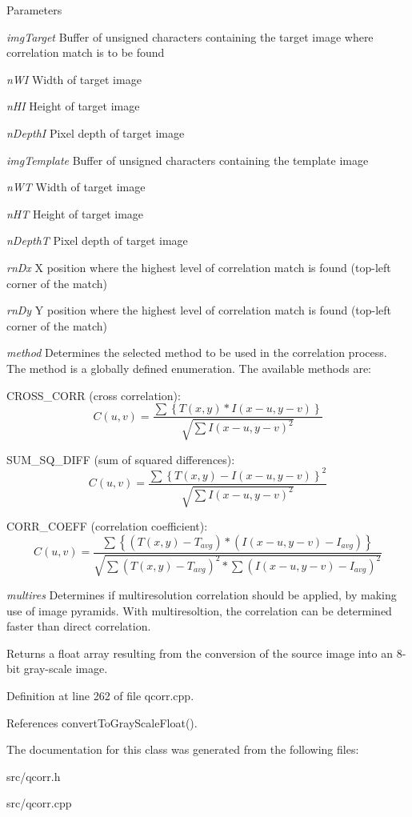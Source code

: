 \begin{DoxyParams}{Parameters}
\item[{\em imgTarget}]Buffer of unsigned characters containing the target image where correlation match is to be found \item[{\em nWI}]Width of target image \item[{\em nHI}]Height of target image \item[{\em nDepthI}]Pixel depth of target image \item[{\em imgTemplate}]Buffer of unsigned characters containing the template image \item[{\em nWT}]Width of target image \item[{\em nHT}]Height of target image \item[{\em nDepthT}]Pixel depth of target image \item[{\em rnDx}]X position where the highest level of correlation match is found (top-\/left corner of the match) \item[{\em rnDy}]Y position where the highest level of correlation match is found (top-\/left corner of the match) \item[{\em method}]Determines the selected method to be used in the correlation process. The method is a globally defined enumeration. The available methods are:
\begin{DoxyItemize}
\item CROSS\_\-CORR (cross correlation): \[ C(u,v) = \frac {\sum{\left\{T(x,y) * I(x-u,y-v)\right\}}} {\sqrt{ \sum{I(x-u,y-v)^2}}} \]
\item SUM\_\-SQ\_\-DIFF (sum of squared differences): \[ C(u,v) = \frac {\sum{\left\{T(x,y)-I(x-u,y-v)\right\}^2}} {\sqrt{\sum{I(x-u,y-v)^2}}} \]
\item CORR\_\-COEFF (correlation coefficient): \[ C(u,v) = \frac {\sum{\left\{(T(x,y)-T_{avg}) * (I(x-u,y-v)-I_{avg})\right\}}} {\sqrt{\sum{(T(x,y)-T_{avg})^2} * \sum{(I(x-u,y-v)-I_{avg})^2}}} \] 
\end{DoxyItemize}\item[{\em multires}]Determines if multiresolution correlation should be applied, by making use of image pyramids. With multiresoltion, the correlation can be determined faster than direct correlation. \end{DoxyParams}
\begin{DoxyReturn}{Returns}
a float array resulting from the conversion of the source image into an 8-\/bit gray-\/scale image. 
\end{DoxyReturn}


Definition at line 262 of file qcorr.cpp.

References convertToGrayScaleFloat().

The documentation for this class was generated from the following files:\begin{DoxyCompactItemize}
\item 
src/qcorr.h\item 
src/qcorr.cpp\end{DoxyCompactItemize}
